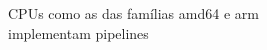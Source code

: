 \documentclass[preview]{standalone}
\begin{document}
CPUs como as das famílias amd64 e arm\\ implementam pipelines\\
\end{document}
